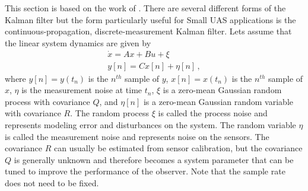 This section is based on the work of \cite{Beard2010}. There are several different forms of the Kalman filter but the form particularly useful for Small UAS applications is the continuous-propagation, discrete-measurement Kalman filter.
Lets assume that the linear system dynamics are given by
\begin{equation}\label{eq:linear_model}
\begin{aligned}
\dot{x}=Ax+Bu+\xi\\
y[n]=Cx[n]+\eta[n]\,,
\end{aligned}
\end{equation}
where \begin{math} y[n] = y(t_n) \end{math} is the \begin{math} n^{th} \end{math} sample of \begin{math} y \end{math}, \begin{math} x[n] = x(t_n) \end{math} is the \begin{math} n^{th} \end{math} sample of \begin{math} x \end{math}, \begin{math} \eta \end{math} is the measurement noise at time \begin{math} t_n\end{math}, \begin{math} \xi \end{math} is a zero-mean Gaussian random process with covariance \begin{math} Q \end{math}, and \begin{math} \eta[n] \end{math} is a zero-mean Gaussian random variable with covariance \begin{math} R \end{math}. The random process \begin{math} \xi \end{math} is called the process noise and represents modeling error and disturbances on the system. The random variable \begin{math} \eta \end{math} is called the measurement noise and represents noise on the sensors. The covariance \begin{math} R \end{math} can usually be estimated from sensor calibration, but the covariance \begin{math} Q \end{math} is generally unknown and therefore becomes a system parameter that can be tuned to improve the performance of the observer. Note that the sample rate does not need to be fixed. \linebreak
